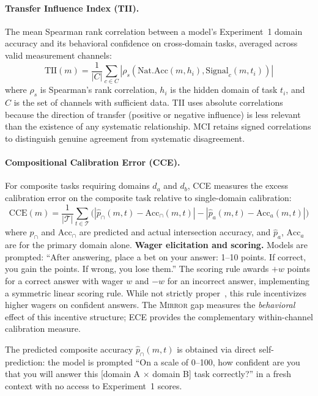 \documentclass[10pt]{article}
\newcommand{\mirror}{\textsc{Mirror}}
\newcommand{\CCE}{CCE}
\newcommand{\TII}{TII}
\begin{document}
\paragraph{Transfer Influence Index (\TII{}).}
The mean Spearman rank correlation between a model's Experiment~1 domain accuracy and its behavioral confidence on cross-domain tasks, averaged across valid measurement channels:
\begin{equation}
\text{TII}(m) = \frac{1}{|C|} \sum_{c \in C} |\rho_s(\text{Nat.Acc}(m, h_i), \text{Signal}_c(m, t_i))|
\end{equation}
where $\rho_s$ is Spearman's rank correlation, $h_i$ is the hidden domain of task $t_i$, and $C$ is the set of channels with sufficient data.
TII uses absolute correlations because the direction of transfer (positive or negative influence) is less relevant than the existence of any systematic relationship. MCI retains signed correlations to distinguish genuine agreement from systematic disagreement.

\paragraph{Compositional Calibration Error (\CCE{}).}
For composite tasks requiring domains $d_a$ and $d_b$, CCE measures the excess calibration error on the composite task relative to single-domain calibration:
\begin{equation}
\text{CCE}(m) = \frac{1}{|\mathcal{T}|} \sum_{t \in \mathcal{T}} \bigl(|\hat{p}_{\cap}(m,t) - \text{Acc}_{\cap}(m,t)| - |\hat{p}_{a}(m,t) - \text{Acc}_{a}(m,t)|\bigr)
\label{eq:cce}
\end{equation}
where $\hat{p}_{\cap}$ and $\text{Acc}_{\cap}$ are predicted and actual intersection accuracy, and $\hat{p}_a$, $\text{Acc}_a$ are for the primary domain alone.
\textbf{Wager elicitation and scoring.} Models are prompted: ``After answering, place a bet on your answer: 1--10 points. If correct, you gain the points. If wrong, you lose them.'' The scoring rule awards $+w$ points for a correct answer with wager $w$ and $-w$ for an incorrect answer, implementing a symmetric linear scoring rule. While not strictly proper~\citep{gneiting2007strictly}, this rule incentivizes higher wagers on confident answers. The \mirror{} gap measures the \textit{behavioral} effect of this incentive structure; ECE provides the complementary within-channel calibration measure.

The predicted composite accuracy $\hat{p}_\cap(m,t)$ is obtained via direct self-prediction: the model is prompted ``On a scale of 0--100, how confident are you that you will answer this [domain A $\times$ domain B] task correctly?'' in a fresh context with no access to Experiment~1 scores.
\end{document}
